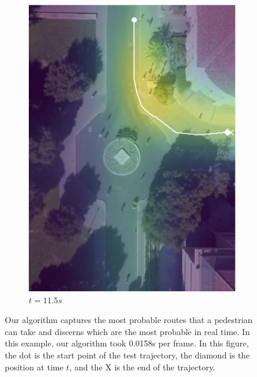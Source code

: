 \documentclass[letterpaper,10pt,conference]{ieeeconf}
\begin{document}
\begin{figure}
\begin{subfigure}[b]{.45\linewidth}
		\includegraphics[width=\linewidth]{./figures/FirstPage/gates_1_2_t=345.png}
		\caption{$t=11.5s$}
	\end{subfigure}
	\caption{Our algorithm captures the most probable routes that a pedestrian can take and discerns which are the most probable in real time. In this example, our algorithm took 0.0158s per frame.  In this figure, the dot is the start point of the test trajectory, the diamond is the position at time $t$, and the X is the end of the trajectory.}
	\label{fig:gates-1-2}
\end{figure}


\end{document}
